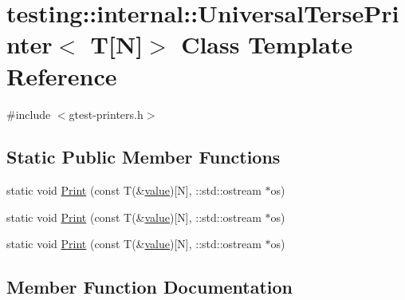 \hypertarget{classtesting_1_1internal_1_1_universal_terse_printer_3_01_t[_n]_4}{}\section{testing\+::internal\+::Universal\+Terse\+Printer$<$ T\mbox{[}N\mbox{]}$>$ Class Template Reference}
\label{classtesting_1_1internal_1_1_universal_terse_printer_3_01_t[_n]_4}


{\ttfamily \#include $<$gtest-\/printers.\+h$>$}

\subsection*{Static Public Member Functions}
\begin{DoxyCompactItemize}
\item 
static void \mbox{\hyperlink{classtesting_1_1internal_1_1_universal_terse_printer_3_01_t[_n]_4_a9e0ceb62fda7dc46ebcf5f911e459a49}{Print}} (const T(\&\mbox{\hyperlink{_obj__test_2lib_2googletest-master_2googlemock_2test_2gmock-matchers__test_8cc_a337b8a670efc0b086ad3af163f3121b6}{value}})\mbox{[}N\mbox{]}, \+::std\+::ostream $\ast$os)
\item 
static void \mbox{\hyperlink{classtesting_1_1internal_1_1_universal_terse_printer_3_01_t[_n]_4_a9e0ceb62fda7dc46ebcf5f911e459a49}{Print}} (const T(\&\mbox{\hyperlink{_obj__test_2lib_2googletest-master_2googlemock_2test_2gmock-matchers__test_8cc_a337b8a670efc0b086ad3af163f3121b6}{value}})\mbox{[}N\mbox{]}, \+::std\+::ostream $\ast$os)
\item 
static void \mbox{\hyperlink{classtesting_1_1internal_1_1_universal_terse_printer_3_01_t[_n]_4_a9e0ceb62fda7dc46ebcf5f911e459a49}{Print}} (const T(\&\mbox{\hyperlink{_obj__test_2lib_2googletest-master_2googlemock_2test_2gmock-matchers__test_8cc_a337b8a670efc0b086ad3af163f3121b6}{value}})\mbox{[}N\mbox{]}, \+::std\+::ostream $\ast$os)
\end{DoxyCompactItemize}


\subsection{Member Function Documentation}
\mbox{\label{classtesting_1_1internal_1_1_universal_terse_printer_3_01_t[_n]_4_a9e0ceb62fda7dc46ebcf5f911e459a49}} 

